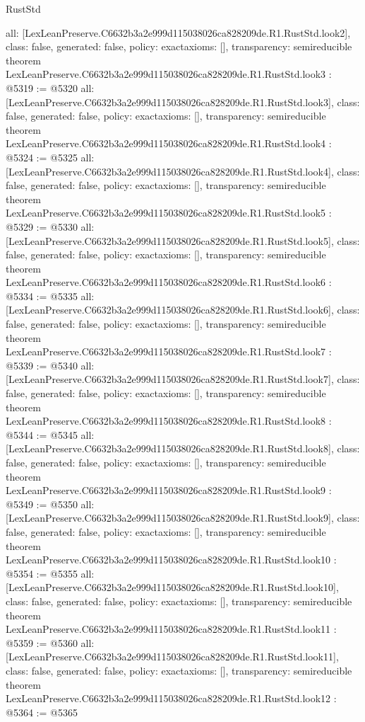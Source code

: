 \begin{lexlean}{RustStd}
\begin{coremodule}
{  all: [LexLeanPreserve.C6632b3a2e999d115038026ca828209de.R1.RustStd.look2],
  class: false,
  generated: false,
  policy: exact{axioms: []},
  transparency: semireducible
}
theorem LexLeanPreserve.C6632b3a2e999d115038026ca828209de.R1.RustStd.look3 : @5319 := @5320 {
  all: [LexLeanPreserve.C6632b3a2e999d115038026ca828209de.R1.RustStd.look3],
  class: false,
  generated: false,
  policy: exact{axioms: []},
  transparency: semireducible
}
theorem LexLeanPreserve.C6632b3a2e999d115038026ca828209de.R1.RustStd.look4 : @5324 := @5325 {
  all: [LexLeanPreserve.C6632b3a2e999d115038026ca828209de.R1.RustStd.look4],
  class: false,
  generated: false,
  policy: exact{axioms: []},
  transparency: semireducible
}
theorem LexLeanPreserve.C6632b3a2e999d115038026ca828209de.R1.RustStd.look5 : @5329 := @5330 {
  all: [LexLeanPreserve.C6632b3a2e999d115038026ca828209de.R1.RustStd.look5],
  class: false,
  generated: false,
  policy: exact{axioms: []},
  transparency: semireducible
}
theorem LexLeanPreserve.C6632b3a2e999d115038026ca828209de.R1.RustStd.look6 : @5334 := @5335 {
  all: [LexLeanPreserve.C6632b3a2e999d115038026ca828209de.R1.RustStd.look6],
  class: false,
  generated: false,
  policy: exact{axioms: []},
  transparency: semireducible
}
theorem LexLeanPreserve.C6632b3a2e999d115038026ca828209de.R1.RustStd.look7 : @5339 := @5340 {
  all: [LexLeanPreserve.C6632b3a2e999d115038026ca828209de.R1.RustStd.look7],
  class: false,
  generated: false,
  policy: exact{axioms: []},
  transparency: semireducible
}
theorem LexLeanPreserve.C6632b3a2e999d115038026ca828209de.R1.RustStd.look8 : @5344 := @5345 {
  all: [LexLeanPreserve.C6632b3a2e999d115038026ca828209de.R1.RustStd.look8],
  class: false,
  generated: false,
  policy: exact{axioms: []},
  transparency: semireducible
}
theorem LexLeanPreserve.C6632b3a2e999d115038026ca828209de.R1.RustStd.look9 : @5349 := @5350 {
  all: [LexLeanPreserve.C6632b3a2e999d115038026ca828209de.R1.RustStd.look9],
  class: false,
  generated: false,
  policy: exact{axioms: []},
  transparency: semireducible
}
theorem LexLeanPreserve.C6632b3a2e999d115038026ca828209de.R1.RustStd.look10 : @5354 := @5355 {
  all: [LexLeanPreserve.C6632b3a2e999d115038026ca828209de.R1.RustStd.look10],
  class: false,
  generated: false,
  policy: exact{axioms: []},
  transparency: semireducible
}
theorem LexLeanPreserve.C6632b3a2e999d115038026ca828209de.R1.RustStd.look11 : @5359 := @5360 {
  all: [LexLeanPreserve.C6632b3a2e999d115038026ca828209de.R1.RustStd.look11],
  class: false,
  generated: false,
  policy: exact{axioms: []},
  transparency: semireducible
}
theorem LexLeanPreserve.C6632b3a2e999d115038026ca828209de.R1.RustStd.look12 : @5364 := @5365 {
}
\end{coremodule}
\end{lexlean}
